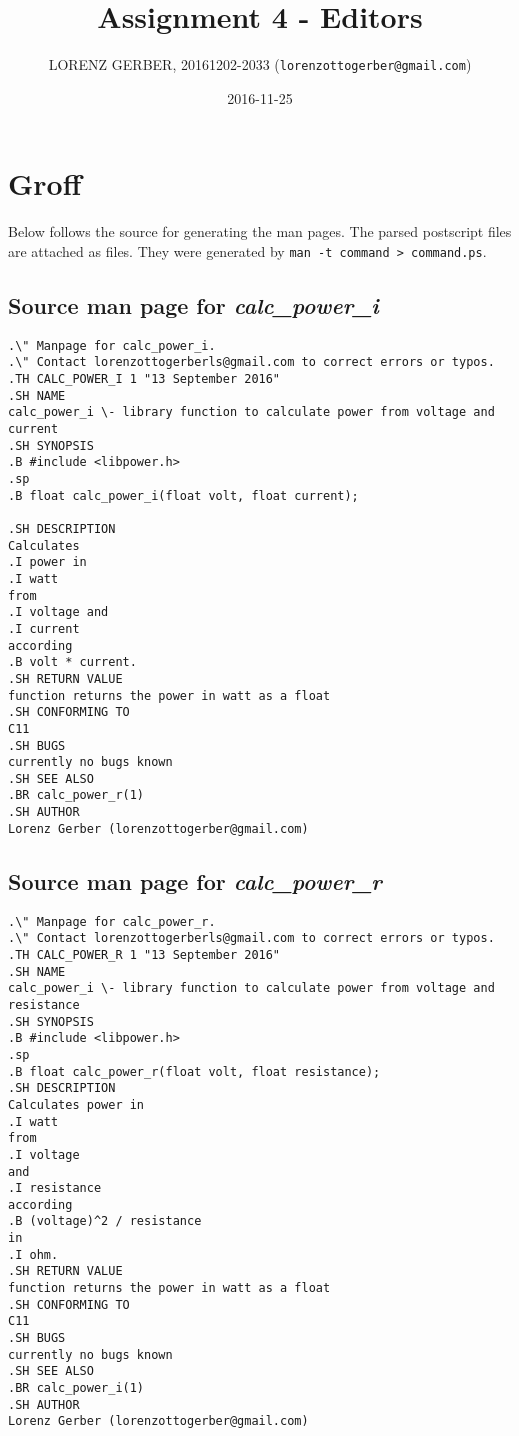 \documentclass[a4paper,11pt,twoside]{article}
\title{Assignment 4 - Editors}
\author{LORENZ GERBER, 20161202-2033 ({\tt{lorenzottogerber@gmail.com}})}
\date{2016-11-25}
\begin{document}
\lstset{language=C}
\maketitle
\thispagestyle{empty}
\newpage

\clearpage
{}

\section{Groff}
Below follows the source for generating the man pages. The parsed postscript files are attached as files. They were generated by \verb+man -t command > command.ps+. 
\subsection{Source man page for \textit{calc\_power\_i}}
\begin{verbatim}
.\" Manpage for calc_power_i.
.\" Contact lorenzottogerberls@gmail.com to correct errors or typos.
.TH CALC_POWER_I 1 "13 September 2016"
.SH NAME
calc_power_i \- library function to calculate power from voltage and current
.SH SYNOPSIS
.B #include <libpower.h>
.sp
.B float calc_power_i(float volt, float current);

.SH DESCRIPTION
Calculates
.I power in
.I watt
from
.I voltage and
.I current
according
.B volt * current.
.SH RETURN VALUE
function returns the power in watt as a float
.SH CONFORMING TO
C11
.SH BUGS
currently no bugs known
.SH SEE ALSO
.BR calc_power_r(1)
.SH AUTHOR
Lorenz Gerber (lorenzottogerber@gmail.com)
\end{verbatim}

\subsection{Source man page for \textit{calc\_power\_r}}

\begin{verbatim}
.\" Manpage for calc_power_r.
.\" Contact lorenzottogerberls@gmail.com to correct errors or typos.
.TH CALC_POWER_R 1 "13 September 2016"
.SH NAME
calc_power_i \- library function to calculate power from voltage and resistance
.SH SYNOPSIS
.B #include <libpower.h>
.sp
.B float calc_power_r(float volt, float resistance);
.SH DESCRIPTION
Calculates power in
.I watt
from
.I voltage
and
.I resistance
according
.B (voltage)^2 / resistance
in
.I ohm.
.SH RETURN VALUE
function returns the power in watt as a float
.SH CONFORMING TO
C11
.SH BUGS
currently no bugs known
.SH SEE ALSO
.BR calc_power_i(1)
.SH AUTHOR
Lorenz Gerber (lorenzottogerber@gmail.com)


\end{verbatim}
\end{document}
